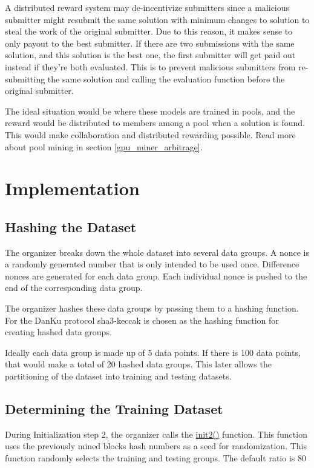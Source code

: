 \documentclass{article}
\begin{document}
A distributed reward system may de-incentivize submitters since a malicious submitter might resubmit the same solution with minimum changes to solution to steal the work of the original submitter. Due to this reason, it makes sense to only payout to the best submitter. If there are two submissions with the same solution, and this solution is the best one, the first submitter will get paid out instead if they’re both evaluated. This is to prevent malicious submitters from re-submitting the same solution and calling the evaluation function before the original submitter.

The ideal situation would be where these models are trained in pools, and the reward would be distributed to members among a pool when a solution is found. This would make collaboration and distributed rewarding possible. Read more about pool mining in section \ref{gpu_miner_arbitrage}.

\section{Implementation}
\label{inplementation}

\subsection{Hashing the Dataset}

The organizer breaks down the whole dataset into several data groups. A nonce is a randomly generated number that is only intended to be used once. Difference nonces are generated for each data group. Each individual nonce is pushed to the end of the corresponding data group.

The organizer hashes these data groups by passing them to a hashing function. For the DanKu protocol sha3-keccak is chosen as the hashing function for creating hashed data groups.

Ideally each data group is made up of 5 data points. If there is 100 data points, that would make a total of 20 hashed data groups. This later allows the partitioning of the dataset into training and testing datasets.

\subsection{Determining the Training Dataset}
\label{determining_the_training_dataset}

During Initialization step 2, the organizer calls the \underline{init2()} function. This function uses the previously mined blocks hash numbers as a seed for randomization. This function randomly selects the training and testing groups. The default ratio is 80%
\end{document}
